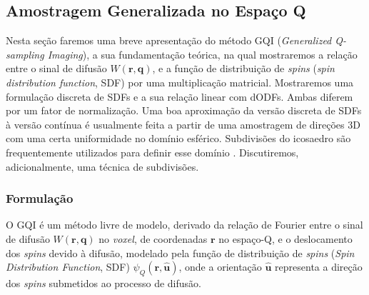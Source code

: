 \documentclass[
    12pt,                %
    oneside,            %
    a4paper,            %
    english,            %
    french,                %
    spanish,            %
    brazil                %
    ]{abntex2}
\begin{document}

\subsection{Amostragem Generalizada no Espaço Q}
\label{sec::gqi}

Nesta seção faremos uma breve apresentação do método GQI (\textit{Generalized Q-sampling Imaging}), a sua fundamentação teórica, na qual mostraremos a relação entre o sinal de difusão $W(\mathbf{r},\mathbf{q})$, e a função de distribuição de \textit{spins} (\textit{spin distribution function}, SDF) por uma multiplicação matricial. Mostraremos uma formulação discreta de SDFs e a sua relação linear com dODFs. Ambas diferem 
por um fator de normalização. Uma boa aproximação da versão discreta de SDFs à versão contínua é usualmente feita a partir de uma amostragem de direções 3D com uma certa uniformidade no domínio esférico. Subdivisões do icosaedro são frequentemente utilizados para definir esse domínio \cite{tuch2002, TuchQBall2004, descoteaux2007, yeh2010}. Discutiremos, adicionalmente, uma técnica de subdivisões.


\subsubsection{Formulação}
\label{ssec::gqi_formulacao}

O GQI é um método livre de modelo, derivado da relação de Fourier entre o sinal de difusão $W(\mathbf{r},\mathbf{q})$ no \textit{voxel}, de coordenadas $\mathbf{r}$ no espaço-Q, e o deslocamento dos \textit{spins} devido à difusão, modelado pela função de distribuição de \textit{spins} (\textit{Spin Distribution Function}, SDF) $\psi_Q(\mathbf{r}, \mathbf{\hat{u}})$, onde a orientação $\mathbf{\hat{u}}$ representa a direção dos \textit{spins} submetidos ao processo de difusão. %
\end{document}
